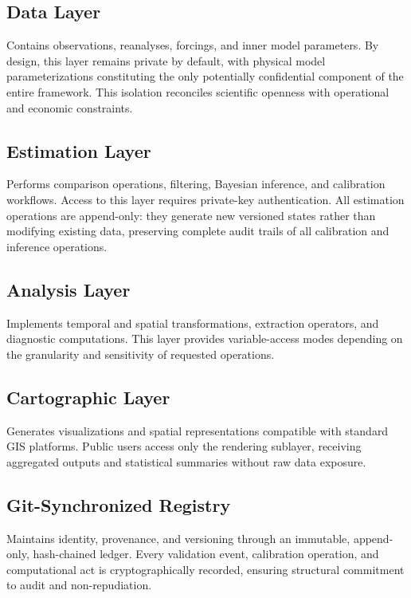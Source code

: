 \subsection{Data Layer}

Contains observations, reanalyses, forcings, and inner model parameters. By design, this layer remains private by default, with physical model parameterizations constituting the only potentially confidential component of the entire framework. This isolation reconciles scientific openness with operational and economic constraints.

\subsection{Estimation Layer}

Performs comparison operations, filtering, Bayesian inference, and calibration workflows. Access to this layer requires private-key authentication. All estimation operations are append-only: they generate new versioned states rather than modifying existing data, preserving complete audit trails of all calibration and inference operations.

\subsection{Analysis Layer}

Implements temporal and spatial transformations, extraction operators, and diagnostic computations. This layer provides variable-access modes depending on the granularity and sensitivity of requested operations.

\subsection{Cartographic Layer}

Generates visualizations and spatial representations compatible with standard GIS platforms. Public users access only the rendering sublayer, receiving aggregated outputs and statistical summaries without raw data exposure.

\subsection{Git-Synchronized Registry}

Maintains identity, provenance, and versioning through an immutable, append-only, hash-chained ledger. Every validation event, calibration operation, and computational act is cryptographically recorded, ensuring structural commitment to audit and non-repudiation.

